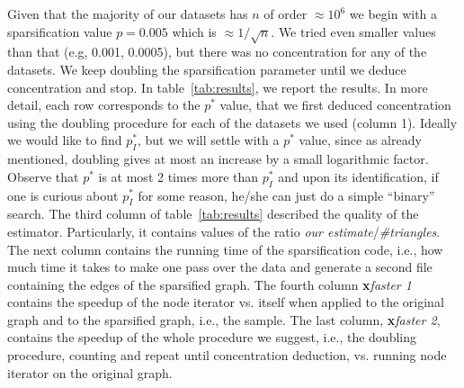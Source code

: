 \documentclass{llncs}
\begin{document}
Given that the majority of our datasets has $n$ of order $\approx 10^6$ we begin with a sparsification value $p=0.005$ which is $\approx 1/\sqrt{n}$.
We tried even smaller values than that (e.g, 0.001, 0.0005), but there was no concentration for any of the datasets.
We keep doubling the sparsification parameter until we deduce concentration and stop. In table~\ref{tab:results},
we report the results. In more detail, each row corresponds to the $p^{*}$ value, that we first deduced concentration using the doubling
procedure for each of the datasets we used (column 1). 
Ideally we would like to find	$p_I^{*}$, but we will settle with a $p^*$ value, since as already mentioned, doubling gives
at most an increase by a small logarithmic factor. 
Observe that $p^*$ is at most 2 times more than $p_I^*$ and upon its identification,
if one is curious about  $p_I^*$  for some reason, he/she can just do a simple ``binary'' search.
The third column of table~\ref{tab:results} described the quality of the estimator. Particularly, 
it contains values of the ratio \textit{our estimate}/\textit{\#triangles}. 
The next column contains the running time of the sparsification code, i.e., how much time it takes
to make one pass over the data and generate a second file containing the edges of the sparsified graph.
The fourth column \textbf{x}\textit{faster 1} contains the speedup of the node iterator vs. itself
when applied to the original graph and to the sparsified graph, i.e., the sample. 
The last column, \textbf{x}\textit{faster 2}, contains the speedup of the whole procedure we suggest, i.e., the doubling procedure,
counting and  repeat until concentration deduction, vs. running node iterator on the original graph. 
\end{document}
